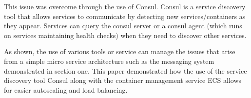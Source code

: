 This issue was overcome through the use of Consul. Consul is a service discovery tool that allows services to communicate by detecting new services/containers as they appear. Services can query the consul server or a consul agent (which runs on services maintaining health checks) when they need to discover other services.

As shown, the use of various tools or service can manage the issues that arise from a simple micro service architecture such as the messaging system demonstrated in section one. This paper demonstrated how the use of the service discovery tool Consul along with the container management service ECS allows for easier autoscaling and load balancing.
